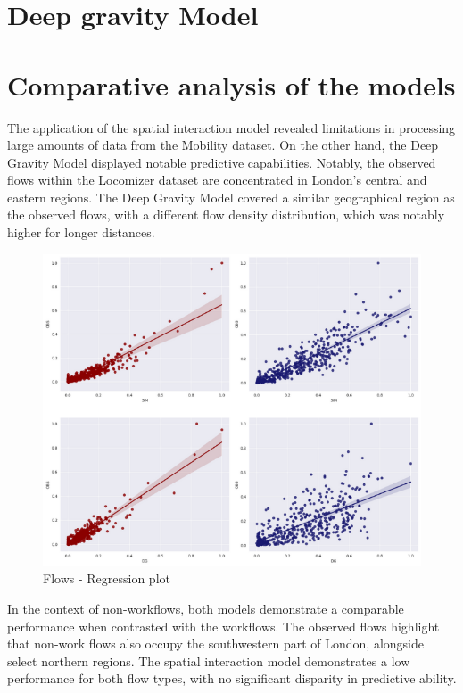     \section{Deep gravity Model} 
    
    \section{Comparative analysis of the models}  

    The application of the spatial interaction model revealed limitations in processing large amounts of data from the Mobility dataset. On the other hand, the Deep Gravity Model displayed notable predictive capabilities. Notably, the observed flows within the Locomizer dataset are concentrated in London's central and eastern regions. The Deep Gravity Model covered a similar geographical region as the observed flows, with a different flow density distribution, which was notably higher for longer distances.


    
       \begin{figure}[H]
            \centering
            \includegraphics[width=14cm]{Images/Flows_regression.png}
            \caption{Flows - Regression plot}
            \label{fig: Flows - Regression}
        \end{figure}

    In the context of non-workflows,  both models demonstrate a comparable performance when contrasted with the workflows. The observed flows highlight that non-work flows also occupy the southwestern part of London, alongside select northern regions. The spatial interaction model demonstrates a low performance for both flow types, with no significant disparity in predictive ability.
    
